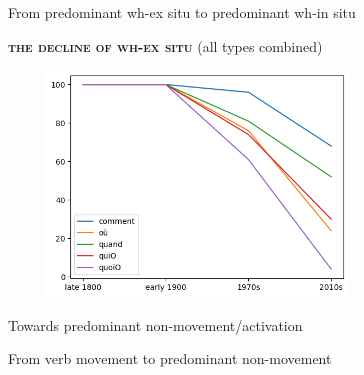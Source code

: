 \documentclass[lesson_slides]{subfiles}
\begin{document}
\begin{frame}[c]{From predominant wh-ex situ to predominant wh-in situ}

    \textbf{\textsc{the decline of wh-ex situ}} (all types combined)
    \begin{center}
        \includegraphics[width=10cm, height=6cm]{images/all.png}
    \end{center}
  
\end{frame}
\begin{frame}[c]{Towards predominant non-movement/activation}
  
\end{frame}
\begin{frame}[c]{From verb movement to predominant non-movement}
  
\end{frame}
\end{document}
